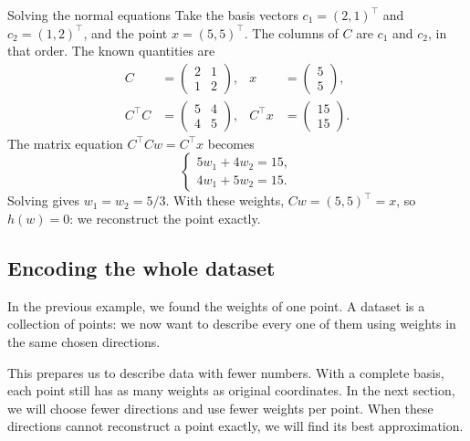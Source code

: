 \documentclass[a4paper,12pt,oneside]{report}
\begin{document}
\begin{framedexample}{Solving the normal equations}
Take the basis vectors $c_1=(2,1)^\top$ and $c_2=(1,2)^\top$,
and the point $x=(5,5)^\top$. The columns of $C$ are $c_1$ and $c_2$,
in that order. The known quantities are
\[
\begin{aligned}
  C&=\begin{pmatrix}2&1\\1&2\end{pmatrix},
  &x&=\begin{pmatrix}5\\5\end{pmatrix},\\[6pt]
  C^\top C&=\begin{pmatrix}5&4\\4&5\end{pmatrix},
  &C^\top x&=\begin{pmatrix}15\\15\end{pmatrix}.
\end{aligned}
\]
The matrix equation $C^\top Cw=C^\top x$ becomes
\[
  \begin{cases}
    5w_1+4w_2=15,\\
    4w_1+5w_2=15.
  \end{cases}
\]
Solving gives $w_1=w_2=5/3$. With these weights, $Cw=(5,5)^\top=x$,
so $h(w)=0$: we reconstruct the point exactly.
\end{framedexample}

\clearpage
\subsection{Encoding the whole dataset}

In the previous example, we found the weights of one point. A dataset
is a collection of points: we now want to describe every one of them
using weights in the same chosen directions.

This prepares us to describe data with fewer numbers. With a complete
basis, each point still has as many weights as original coordinates.
In the next section, we will choose fewer directions and use fewer
weights per point. When these directions cannot reconstruct a point
exactly, we will find its best approximation.
\end{document}
